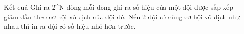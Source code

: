 Kết quả  
Ghi ra 2^N dòng mỗi dòng ghi ra số hiệu của một đội được sắp xếp giảm dần theo cơ hội vô địch của đội đó. Nếu 2 đội có cùng cơ hội vô địch như nhau thì in ra đội có số hiệu nhỏ hơn trước.